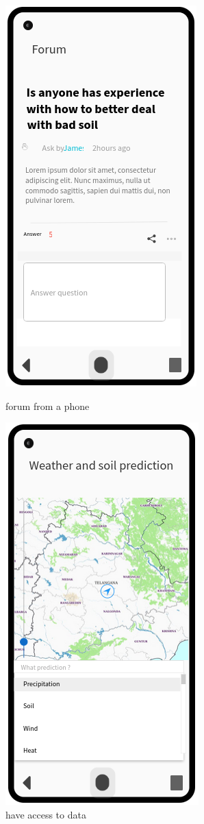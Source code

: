 \begin{figure}[H]
	
	\begin{minipage}{0.48\textwidth}
		
		\centering
		
		\includegraphics[width=0.5\columnwidth]{Images/forum.png}
		
		\caption{forum from a phone}
		
		\label{Fig:interface_forum}
		
	\end{minipage} %
	\begin{minipage}{0.48\textwidth}
		
		\centering
		
		\includegraphics[width=0.5\columnwidth]{Images/meteo.png}
		\caption{have access to data}
		

\end{minipage}
\end{figure}
